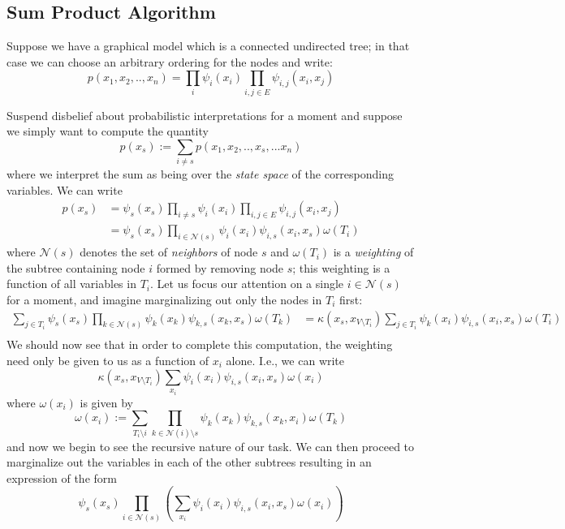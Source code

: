 \subsection{Sum Product Algorithm}

Suppose we have a graphical model which is a connected undirected tree; in that case we can choose an arbitrary ordering for the nodes and write:
$$
p(x_1, x_2, .., x_n) = \prod_i \psi_i(x_i) \prod_{i, j \in E} \psi_{i,j}(x_i, x_j)
$$

Suspend disbelief about probabilistic interpretations for a moment and suppose we simply want to compute the quantity
$$
p(x_s) := \sum_{i \neq s} p(x_1, x_2, ..,x_s,... x_n)
$$
where we interpret the sum as being over the \emph{state space} of the corresponding variables.  We can write
\begin{equation*}
\begin{aligned}
p(x_s) &= \psi_s(x_s) \prod_{i\neq s} \psi_i(x_i) \prod_{i, j \in E} \psi_{i,j}(x_i, x_j)\\
&= \psi_s(x_s) \prod_{i \in \mathcal{N}(s)} \psi_i(x_i) \psi_{i,s}(x_i, x_s) \omega(T_i)
\end{aligned}
\end{equation*}
where $\mathcal{N}(s)$ denotes the set of \emph{neighbors} of node $s$ and $\omega(T_i)$ is a \emph{weighting} of the subtree containing node $i$ formed by removing node $s$; this weighting is a function of all variables in $T_i$.  Let us focus our attention on a single $i\in\mathcal{N}(s)$ for a moment, and imagine marginalizing out only the nodes in $T_i$ first:
\begin{equation*}
\begin{aligned}
\sum_{j\in T_i}\psi_s(x_s) \prod_{k \in \mathcal{N}(s)} \psi_k(x_k) \psi_{k,s}(x_k, x_s) \omega(T_k) &= \kappa(x_s, x_{V\setminus T_i}) \sum_{j\in T_i} \psi_k(x_i) \psi_{i,s}(x_i, x_s) \omega(T_i)\\
\end{aligned}
\end{equation*}
We should now see that in order to complete this computation, the weighting need only be given to us as a function of $x_i$ alone.  I.e., we can write
$$
\kappa(x_s, x_{V\setminus T_i}) \sum_{x_i} \psi_i(x_i) \psi_{i,s}(x_i, x_s) \omega(x_i)
$$
where $\omega(x_i)$ is given by
$$
\omega(x_i) := \sum_{T_i \setminus i}\prod_{k \in \mathcal{N}(i)\setminus {s}} \psi_k(x_k) \psi_{k,s}(x_k, x_i) \omega(T_k)
$$
and now we begin to see the recursive nature of our task.  We can then proceed to marginalize out the variables in each of the other subtrees resulting in an expression of the form
$$
\psi_s(x_s)\prod_{i\in\mathcal{N}(s)}\left( \sum_{x_i} \psi_i(x_i) \psi_{i,s}(x_i, x_s) \omega(x_i)\right)
$$

